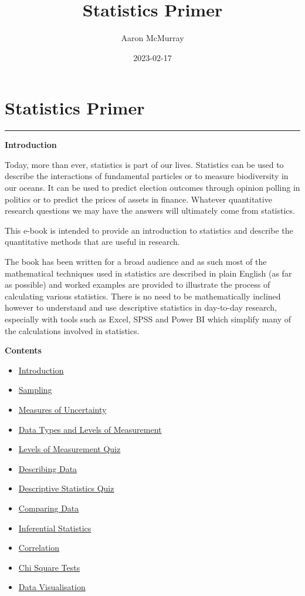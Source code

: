 \documentclass[
]{book}
\title{Statistics Primer}
\author{Aaron McMurray}
\date{2023-02-17}
\providecommand{\tightlist}{%
  \setlength{\itemsep}{0pt}\setlength{\parskip}{0pt}}
\begin{document}
\maketitle

{
\setcounter{tocdepth}{1}
\tableofcontents
}
\hypertarget{Statistics-Primer}{%
\chapter*{Statistics Primer}\label{Statistics-Primer}}

\begin{center}\rule{0.5\linewidth}{0.5pt}\end{center}

\textbf{Introduction}

Today, more than ever, statistics is part of our lives. Statistics can be used to describe the interactions of fundamental particles or to measure biodiversity in our oceans. It can be used to predict election outcomes through opinion polling in politics or to predict the prices of assets in finance. Whatever quantitative research questions we may have the answers will ultimately come from statistics.

This e-book is intended to provide an introduction to statistics and describe the quantitative methods that are useful in research.

The book has been written for a broad audience and as such most of the mathematical techniques used in statistics are described in plain English (as far as possible) and worked examples are provided to illustrate the process of calculating various statistics. There is no need to be mathematically inclined however to understand and use descriptive statistics in day-to-day research, especially with tools such as Excel, SPSS and Power BI which simplify many of the calculations involved in statistics.

\textbf{Contents}

\begin{itemize}
\tightlist
\item
  \protect\hyperlink{intro}{Introduction}
\item
  \protect\hyperlink{sampling}{Sampling}
\item
  \protect\hyperlink{error}{Measures of Uncertainty}
\item
  \protect\hyperlink{datatypes}{Data Types and Levels of Measurement}
\item
  \protect\hyperlink{quizone}{Levels of Measurement Quiz}
\item
  \protect\hyperlink{descdata}{Describing Data}
\item
  \protect\hyperlink{quiztwo}{Descriptive Statistics Quiz}
\item
  \protect\hyperlink{compdat}{Comparing Data}
\item
  \protect\hyperlink{infstat}{Inferential Statistics}
\item
  \protect\hyperlink{correlationchapter}{Correlation}
\item
  \protect\hyperlink{chisq}{Chi Square Tests}
\item
  \protect\hyperlink{datvis}{Data Visualisation}
\end{itemize}
\end{document}
